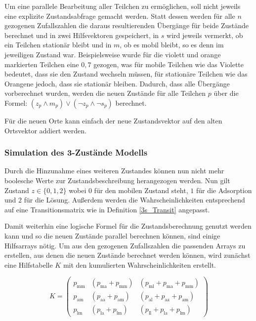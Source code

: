 Um eine parallele Bearbeitung aller Teilchen zu ermöglichen, soll nicht jeweils eine explizite Zustandsabfrage gemacht werden. Statt dessen werden für alle $n$ gezogenen Zufallszahlen die daraus resultierenden Übergänge für beide Zustände berechnet und in zwei Hilfsvektoren gespeichert, in $s$ wird jeweils vermerkt, ob ein Teilchen stationär bleibt und in $m$, ob es mobil bleibt, so es denn im jeweiligen Zustand war. Beispielsweise wurde für die violett und orange markierten Teilchen eine $0,7$ gezogen, was für mobile Teilchen wie das Violette bedeutet, dass sie den Zustand wechseln müssen, für stationäre Teilchen wie das Orangene jedoch, dass sie stationär bleiben. 
Dadurch, dass alle Übergänge vorberechnet wurden, werden die neuen Zustände für alle Teilchen $p$ über die Formel: $(z_p \land m_p) \lor (\lnot z_p \land \lnot s_p)$ berechnet. 

Für die neuen Orte kann einfach der neue Zustandsvektor auf den alten Ortsvektor addiert werden.


\subsubsection{Simulation des 3-Zustände Modells}

Durch die Hinzunahme eines weiteren Zustandes können nun nicht mehr boolesche Werte zur Zustandsbeschreibung herangezogen werden. Nun gilt Zustand $z \in \{0, 1, 2\}$  wobei $0$ für den mobilen Zustand steht, $1$ für die Adsorption und $2$ für die Lösung. Außerdem werden die Wahrscheinlichkeiten entsprechend auf eine Transitionsmatrix wie in Definition \ref{3s_Transit} angepasst.

Damit weiterhin eine logische Formel für die Zustandsberechnung genutzt werden kann und so die neuen Zustände parallel berechnen können, sind einige Hilfsarrays nötig. %
Um aus den gezogenen Zufallszahlen die passenden Arrays zu erstellen, aus denen die neuen Zustände berechnet werden können, wird zunächst eine Hilfstabelle $K$ mit den kumulierten Wahrscheinlichkeiten erstellt. %

\begin{equation}
K= 
\begin{pmatrix}
p_{\text{mm}} & (p_{\text{ma}} + p_{\text{mm}}) & (p_{\text{ml}} + p_{\text{ma}} + p_{\text{mm}}) \\
p_{\text{am}} & (p_{\text{aa}} + p_{\text{am}}) & (p_{\text{al}} + p_{\text{aa}} + p_{\text{am}})\\
p_{\text{lm}} & (p_{\text{la}} + p_{\text{lm}}) & (p_{\text{ll}} + p_{\text{la}} + p_{\text{lm}}) 
\end{pmatrix}
\label{kummatrix}
\end{equation}

